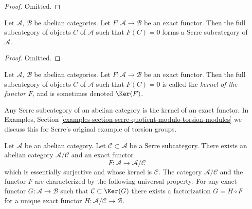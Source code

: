 \begin{proof}
Omitted.
\end{proof}

\begin{lemma}
\label{lemma-kernel-exact-functor}
Let $\mathcal{A}$, $\mathcal{B}$ be abelian categories.
Let $F : \mathcal{A} \to \mathcal{B}$ be an exact functor.
Then the full subcategory of objects $C$ of $\mathcal{A}$
such that $F(C) = 0$ forms a Serre subcategory of $\mathcal{A}$.
\end{lemma}

\begin{proof}
Omitted.
\end{proof}

\begin{definition}
\label{definition-kernel-category}
Let $\mathcal{A}$, $\mathcal{B}$ be abelian categories.
Let $F : \mathcal{A} \to \mathcal{B}$ be an exact functor.
Then the full subcategory of objects $C$ of $\mathcal{A}$
such that $F(C) = 0$ is called the {\it kernel of the functor $F$},
and is sometimes denoted $\Ker(F)$.
\end{definition}

\noindent
Any Serre subcategory of an abelian category is the kernel of
an exact functor. In
Examples, Section \ref{examples-section-serre-quotient-modulo-torsion-modules}
we discuss this for Serre's original example of torsion groups.

\begin{lemma}
\label{lemma-serre-subcategory-is-kernel}
Let $\mathcal{A}$ be an abelian category.
Let $\mathcal{C} \subset \mathcal{A}$ be a Serre subcategory.
There exists an abelian category $\mathcal{A}/\mathcal{C}$
and an exact functor
$$
F : \mathcal{A} \longrightarrow \mathcal{A}/\mathcal{C}
$$
which is essentially surjective and whose kernel is $\mathcal{C}$.
The category $\mathcal{A}/\mathcal{C}$ and the functor $F$ are
characterized by the following universal property: For any exact
functor $G : \mathcal{A} \to \mathcal{B}$ such that
$\mathcal{C} \subset \Ker(G)$ there exists a factorization
$G = H \circ F$ for a unique exact functor
$H : \mathcal{A}/\mathcal{C} \to \mathcal{B}$.
\end{lemma}

